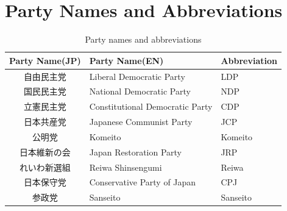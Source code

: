 \documentclass[final,5p,times,twocolumn,authoryear]{elsarticle}
\begin{document}
\FloatBarrier
\section{Party Names and Abbreviations}
\begin{CJK}{UTF8}{min}
\begin{table}[htbp] %
\centering
\caption{Party names and abbreviations}\label{tab:Parties and abbrev}
\begin{tabularx}{.45\textwidth}{ c|X|X } 
\hline
 Party Name(JP) & Party Name(EN) & Abbreviation\\  
 \hline
  自由民主党  & Liberal Democratic Party & LDP \\
  \hline
  国民民主党  & National Democratic Party & NDP \\
  \hline
  立憲民主党  & Constitutional Democratic Party & CDP \\
  \hline
  日本共産党  & Japanese Communist Party & JCP \\
  \hline
  公明党  & Komeito & Komeito \\
   \hline
  日本維新の会  & Japan Restoration Party & JRP \\
  \hline
  れいわ新選組  & Reiwa Shinsengumi & Reiwa \\
  \hline
  日本保守党  & Conservative Party of Japan & CPJ \\
  \hline
  参政党  & Sanseito & Sanseito \\
  \hline
  
\end{tabularx}
\end{table}
\end{CJK}

\clearpage
 

\end{document}

